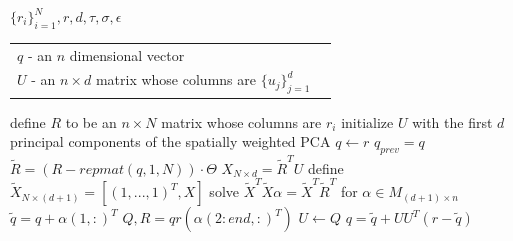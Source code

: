 \documentclass[12pt]{article}
\theoremstyle{remark}
\begin{document}
\begin{algorithm}[H]
\caption{Step 1: in practice}
\label{alg:step1Inpractice_clean}
\begin{algorithmic}[1]
 $\lbrace r_i \rbrace_{i=1}^N, r, d, \tau, \sigma,\epsilon$
\begin{tabular}[t]{ll}
                         $q$ - an $n$ dimensional vector \\
                         $U$ - an $n\times d$ matrix whose columns are $\lbrace u_j \rbrace_{j=1}^d$ 
                         \end{tabular}
\State define $R$ to be an $n\times N$ matrix whose columns are $r_i$
\State initialize $U$ with the first $d$ principal components of the spatially weighted PCA \label{algstep:U_init_in_practice}
\State $q\leftarrow r$
\Repeat
    \State $q_{prev} = q$
    \State $\tilde{R} = (R - repmat(q,1,N))\cdot \Theta$ 
    \State $X_{N\times d} = \tilde{R}^T U$ 
    \State define $\tilde{X}_{N\times (d+1)} = \left[(1,...,1)^T, X\right]$
    \State solve $\tilde{X}^T\tilde{X}\alpha = \tilde{X}^T \tilde{R}^T$ for $\alpha \in M_{(d+1)\times n}$ 
    \State $\tilde{q} = q + \alpha(1,:)^T$
    \State $Q, \hat{R} = qr(\alpha(2:end, :)^T)$ 
    \State $U \leftarrow Q$
    \State $q = \tilde{q} + U U^T (r-\tilde{q})$
\end{algorithmic}
\end{algorithm}
\end{document}
